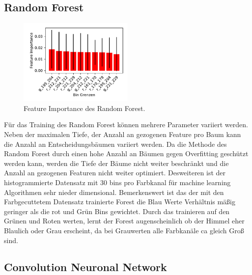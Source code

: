 \subsection{Random Forest}%
\label{sub:random_forest}
\begin{figure}
		\centering
		\vspace{-1.2cm}
		\includegraphics[width=0.5\textwidth]{./pictures/train_rf.pdf}
		\vspace{-1.4cm}
		\caption{Feature Importance des Random Forest.}
		\vspace{-1.4cm}
		\label{fig:}
\end{figure}
Für das Training des Random Forest können mehrere Parameter variiert werden.
Neben der maximalen Tiefe, der Anzahl an gezogenen Feature pro Baum kann die 
Anzahl an Entscheidungsbäumen variiert werden.
Da die Methode des Random Forest durch einen hohe Anzahl an Bäumen gegen 
Overfitting geschützt werden kann, werden die Tiefe der Bäume nicht weiter
beschränkt und die Anzahl an gezogenen Featuren nicht weiter optimiert.
Desweiteren ist der histogrammierte Datensatz mit 30 bins pro Farbkanal für
machine learning Algorithmen sehr nieder dimensional.
Bemerkenswert ist das der mit den Farbgecuttetem Datensatz trainierte Forest die
Blau Werte Verhältnis mäßig geringer als die rot und Grün Bins gewichtet.
Durch das trainieren auf den Grünen und Roten werten, lernt der Forest
augenscheinlich ob der Himmel eher Blaulich oder Grau erscheint, da bei
Grauwerten alle Farbkanäle ca gleich Groß sind.

\subsection{Convolution Neuronal Network}%
\label{sub:convolution_neuronal_network}

